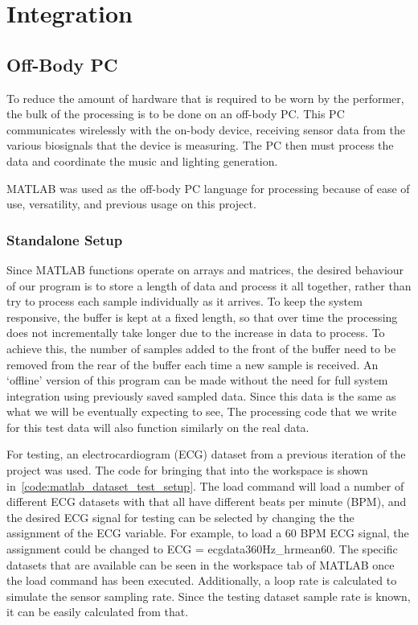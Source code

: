 \chapter{Integration}
\section{Off-Body PC}
To reduce the amount of hardware that is required to be worn by the performer,
the bulk of the processing is to be done on an off-body PC.
This PC communicates wirelessly with the on-body device,
receiving sensor data from the various biosignals that the device is measuring.
The PC then must process the data and coordinate the music and lighting generation.

MATLAB was used as the off-body PC language for processing because of ease of use, versatility,
and previous usage on this project.

\subsection{Standalone Setup}
Since MATLAB functions operate on arrays and matrices,
the desired behaviour of our program is to store a length of data and process it all together,
rather than try to process each sample individually as it arrives.
To keep the system responsive, the buffer is kept at a fixed length,
so that over time the processing does not incrementally take longer due to the increase in data to process.
To achieve this, the number of samples added to the front of the buffer need to be removed from the rear of the buffer each time a new sample is received.
An `offline' version of this program can be made without the need for full system integration using previously saved sampled data.
Since this data is the same as what we will be eventually expecting to see,
The processing code that we write for this test data will also function similarly on the real data.

For testing, an electrocardiogram (ECG) dataset from a previous iteration of the project was used.
The code for bringing that into the workspace is shown in~\autoref{code:matlab_dataset_test_setup}.
The load command will load a number of different ECG datasets with that all have different beats per minute (BPM),
and the desired ECG signal for testing can be selected by changing the the assignment of the ECG variable.
For example, to load a 60 BPM ECG signal, the assignment could be changed to ECG = ecgdata360Hz\_hrmean60.
The specific datasets that are available can be seen in the workspace tab of MATLAB once the load command has been executed.
Additionally, a loop rate is calculated to simulate the sensor sampling rate.
Since the testing dataset sample rate is known, it can be easily calculated from that.

